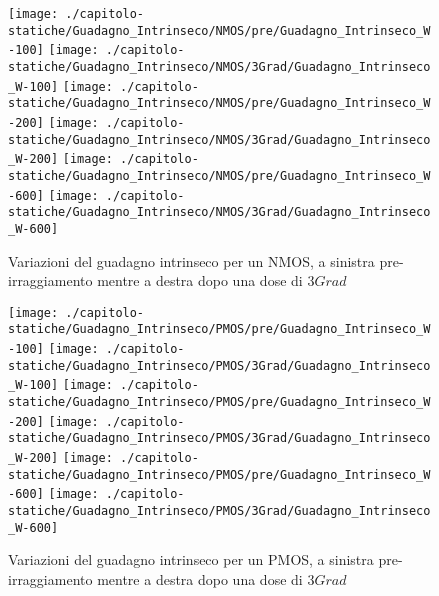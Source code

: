 \begin{figure}[ht]
    \centering
    \texttt{[image: ./capitolo-statiche/Guadagno\_Intrinseco/NMOS/pre/Guadagno\_Intrinseco\_W-100]}
    \texttt{[image: ./capitolo-statiche/Guadagno\_Intrinseco/NMOS/3Grad/Guadagno\_Intrinseco\_W-100]}
    \texttt{[image: ./capitolo-statiche/Guadagno\_Intrinseco/NMOS/pre/Guadagno\_Intrinseco\_W-200]}
    \texttt{[image: ./capitolo-statiche/Guadagno\_Intrinseco/NMOS/3Grad/Guadagno\_Intrinseco\_W-200]}
    \texttt{[image: ./capitolo-statiche/Guadagno\_Intrinseco/NMOS/pre/Guadagno\_Intrinseco\_W-600]}
    \texttt{[image: ./capitolo-statiche/Guadagno\_Intrinseco/NMOS/3Grad/Guadagno\_Intrinseco\_W-600]}

    \caption{Variazioni del guadagno intrinseco per un NMOS, a sinistra pre-irraggiamento mentre a destra dopo una dose di $3Grad$}
    \label{fig:guadagnoIntrinseco_N}
\end{figure}


\begin{figure}[ht]
    \centering
    \texttt{[image: ./capitolo-statiche/Guadagno\_Intrinseco/PMOS/pre/Guadagno\_Intrinseco\_W-100]}
    \texttt{[image: ./capitolo-statiche/Guadagno\_Intrinseco/PMOS/3Grad/Guadagno\_Intrinseco\_W-100]}
    \texttt{[image: ./capitolo-statiche/Guadagno\_Intrinseco/PMOS/pre/Guadagno\_Intrinseco\_W-200]}
    \texttt{[image: ./capitolo-statiche/Guadagno\_Intrinseco/PMOS/3Grad/Guadagno\_Intrinseco\_W-200]}
    \texttt{[image: ./capitolo-statiche/Guadagno\_Intrinseco/PMOS/pre/Guadagno\_Intrinseco\_W-600]}
    \texttt{[image: ./capitolo-statiche/Guadagno\_Intrinseco/PMOS/3Grad/Guadagno\_Intrinseco\_W-600]}

    \caption{Variazioni del guadagno intrinseco per un PMOS, a sinistra pre-irraggiamento mentre a destra dopo una dose di $3Grad$}
    \label{fig:guadagnoIntrinseco_P}
\end{figure}